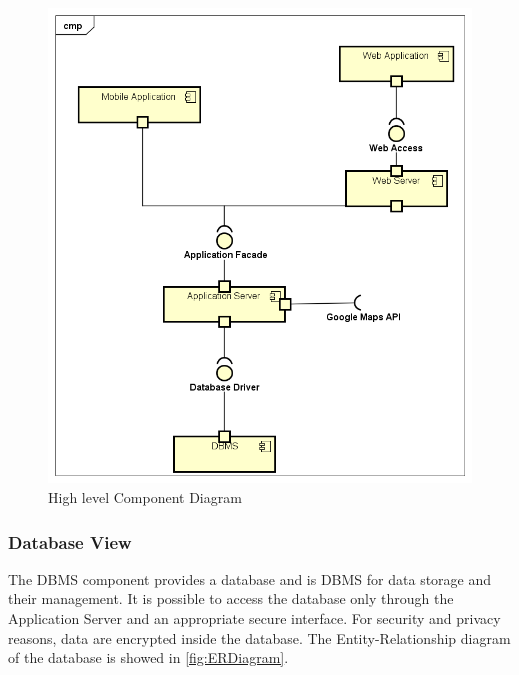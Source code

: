 \begin{figure}
	\includegraphics[width = \textwidth, keepaspectratio = true]{Img/HighLevelComponent}
	\caption{High level Component Diagram}
	\label{fig:hlCD}
\end{figure}

\subsubsection{Database View}
The DBMS component provides a database and is DBMS for data storage and their management.
It is possible to access the database only through the Application Server and an appropriate secure interface.
For security and privacy reasons, data are encrypted inside the database.
The Entity-Relationship diagram of the database is showed in \autoref{fig:ERDiagram}.

